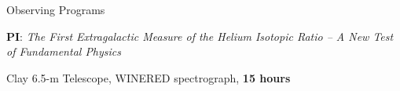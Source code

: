 \documentclass[cv.tex]{subfiles}
\begin{document}
\vspace{4mm}
\noindent
{\color{themecolor} \large Observing Programs}
\par\noindent
\parbox{0.18\textwidth}{%
	 \par
	\null \par
	\null
}
\hspace{1mm}
\parbox{0.8\textwidth}{%
	\textbf{PI}: \textit{The First Extragalactic Measure of the Helium Isotopic
	Ratio -- A New Test \\ of Fundamental Physics} \par
	Clay 6.5-m Telescope, WINERED spectrograph, \textbf{15 hours}
}
\end{document}
